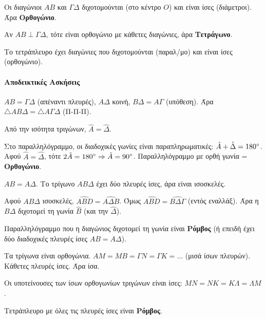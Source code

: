 \documentclass[11pt,a4paper,modern]{FFExercises}
\begin{document}
\begin{alist}
    \item Οι διαγώνιοι $A B$ και $\varGamma\Delta$ διχοτομούνται (στο κέντρο $O$) και είναι ίσες (διάμετροι). Άρα \textbf{Ορθογώνιο}.
    \item Αν $AB \perp \varGamma\Delta$, τότε είναι ορθογώνιο με κάθετες διαγώνιες, άρα \textbf{Τετράγωνο}.
    \item Το τετράπλευρο έχει διαγώνιες που διχοτομούνται (παραλ/μο) και είναι ίσες (ορθογώνιο).
\end{alist}

\paragraph{Αποδεικτικές Ασκήσεις}

\begin{alist}
    \item $AB=\varGamma\Delta$ (απέναντι πλευρές), $A\Delta$ κοινή, $B\Delta=A\varGamma$ (υπόθεση). Άρα $\triangle AB\Delta = \triangle A\varGamma\Delta$ (Π-Π-Π).
    \item Από την ισότητα τριγώνων, $\hat{A} = \hat{\Delta}$.
    \item Στο παραλληλόγραμμο, οι διαδοχικές γωνίες είναι παραπληρωματικές: $\hat{A}+\hat{\Delta}=180\degree$. Αφού $\hat{A}=\hat{\Delta}$, τότε $2\hat{A}=180\degree \Rightarrow \hat{A}=90\degree$. Παραλληλόγραμμο με ορθή γωνία = \textbf{Ορθογώνιο}.
\end{alist}

\begin{alist}
    \item $AB=A\Delta$. Το τρίγωνο $AB\Delta$ έχει δύο πλευρές ίσες, άρα είναι ισοσκελές.
    \item Αφού $AB\Delta$ ισοσκελές, $\hat{ABD} = \hat{A\Delta B}$. Όμως $\hat{ABD} = \hat{B\Delta \varGamma}$ (εντός εναλλάξ). Άρα η $B\Delta$ διχοτομεί τη γωνία $\hat{B}$ (και την $\hat{\Delta}$).
    \item Παραλληλόγραμμο που η διαγώνιος διχοτομεί τη γωνία είναι \textbf{Ρόμβος} (ή επειδή έχει δύο διαδοχικές πλευρές ίσες $AB=A\Delta$).
\end{alist}

\begin{alist}
    \item Τα τρίγωνα είναι ορθογώνια. $AM=MB=\varGamma N=\varGamma K = \dots$ (μισά ίσων πλευρών). Κάθετες πλευρές ίσες. Άρα ίσα.
    \item Οι υποτείνουσες των ίσων ορθογωνίων τριγώνων είναι ίσες: $MN=NK=K\Lambda=\Lambda M$.
    \item Τετράπλευρο με όλες τις πλευρές ίσες είναι \textbf{Ρόμβος}.
\end{alist}
\end{document}

